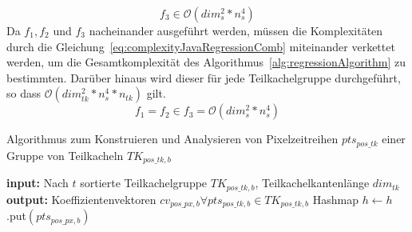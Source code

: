 \begin{equation} \label{eq:complexityJavaRegression3}
f_3 \in \mathcal{O}(dim_{s}^2 * n_{s}^4)
\end{equation}
%
Da $f_1, f_2$ und $f_3$ nacheinander ausgeführt werden, müssen die Komplexitäten durch die Gleichung~\ref{eq:complexityJavaRegressionComb} miteinander verkettet werden, um die Gesamtkomplexität des Algorithmus~\ref{alg:regressionAlgorithm} zu bestimmten. Darüber hinaus wird dieser für jede Teilkachelgruppe durchgeführt, so dass $\mathcal{O}(dim_{tk}^2 * n_{s}^4 * n_{tk})$ gilt.
%
\begin{equation} \label{eq:complexityJavaRegressionComb}
f_1 = f_2 \in f_3 = \mathcal{O}(dim_{s}^2 * n_{s}^4)
\end{equation}
%
\begin{algorithm}[H]
\small
\caption{Algorithmus zum Konstruieren und Analysieren von Pixelzeitreihen  $pts_{pos\_tk}$ einer Gruppe von Teilkacheln $TK_{pos\_tk, b}$}
\label{alg:regressionAlgorithm}
\begin{algorithmic}[1]
	\State \textbf{input:} Nach $t$ sortierte Teilkachelgruppe $TK_{pos\_tk, b}$, Teilkachelkantenlänge $dim_{tk}$ 
	\State \textbf{output:} Koeffizientenvektoren $cv_{pos\_px, b} \forall pts_{pos\_tk, b} \in TK_{pos\_tk, b}$
	  \label{alg:constructPTS}
        		  \label{alg:iterY1}
			\State Hashmap $h \leftarrow h$.put$(pts_{pos\_px, b})$  
		\EndFor
	\EndFor
	  \label{alg:iterTK}
		  \label{alg:iterX1}
        			  \label{alg:iterY1}
				  \label{alg:endIterTK}
			\EndFor
		\EndFor
	\EndFor
	  \label{alg:iterPTSJava}
		  \label{alg:defineSVR}
		  \label{alg:normalizeY}
		  \label{alg:constructSVR}
		  \label{alg:executeRegression}
	\EndFor
\EndFunction
\end{algorithmic}
\end{algorithm}

